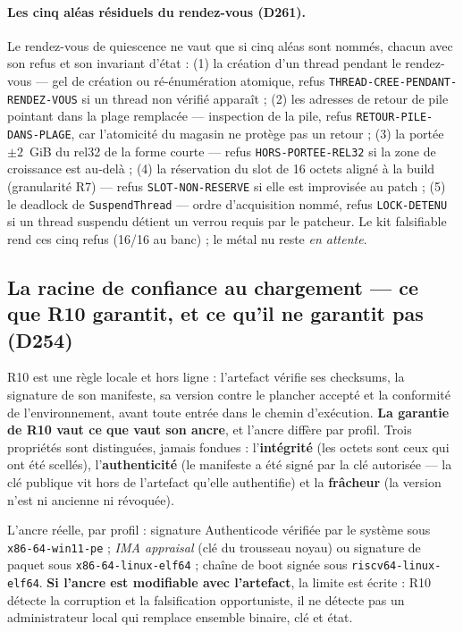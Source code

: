 \paragraph{Les cinq aléas résiduels du rendez-vous (D261).} Le rendez-vous de quiescence ne vaut que si
cinq aléas sont nommés, chacun avec son refus et son invariant d’état : (1) la création d’un thread pendant
le rendez-vous — gel de création ou ré-énumération atomique, refus \texttt{THREAD-CREE-PENDANT-RENDEZ-VOUS}
si un thread non vérifié apparaît ; (2) les adresses de retour de pile pointant dans la plage remplacée —
inspection de la pile, refus \texttt{RETOUR-PILE-DANS-PLAGE}, car l’atomicité du magasin ne protège pas un
retour ; (3) la portée $\pm 2$~GiB du rel32 de la forme courte — refus \texttt{HORS-PORTEE-REL32} si la zone de
croissance est au-delà ; (4) la réservation du slot de 16 octets aligné à la build (granularité R7) — refus
\texttt{SLOT-NON-RESERVE} si elle est improvisée au patch ; (5) le deadlock de \texttt{SuspendThread} — ordre
d’acquisition nommé, refus \texttt{LOCK-DETENU} si un thread suspendu détient un verrou requis par le patcheur.
Le kit falsifiable rend ces cinq refus (16/16 au banc) ; le métal nu reste \emph{en attente}.

\subsection{La racine de confiance au chargement — ce que R10 garantit, et ce qu’il ne garantit pas (D254)}\label{sec:racine}

R10 est une règle locale et hors ligne : l’artefact vérifie ses checksums, la signature de son
manifeste, sa version contre le plancher accepté et la conformité de l’environnement, avant toute entrée
dans le chemin d’exécution. \textbf{La garantie de R10 vaut ce que vaut son ancre}, et l’ancre diffère par
profil. Trois propriétés sont distinguées, jamais fondues : l’\textbf{intégrité} (les octets sont ceux qui
ont été scellés), l’\textbf{authenticité} (le manifeste a été signé par la clé autorisée — la clé publique
vit hors de l’artefact qu’elle authentifie) et la \textbf{frâcheur} (la version n’est ni ancienne ni
révoquée).

L’ancre réelle, par profil : signature Authenticode vérifiée par le système sous \texttt{x86-64-win11-pe} ;
\emph{IMA appraisal} (clé du trousseau noyau) ou signature de paquet sous \texttt{x86-64-linux-elf64} ;
chaîne de boot signée sous \texttt{riscv64-linux-elf64}. \textbf{Si l’ancre est modifiable avec l’artefact},
la limite est écrite : R10 détecte la corruption et la falsification opportuniste, il ne détecte pas un
administrateur local qui remplace ensemble binaire, clé et état.

